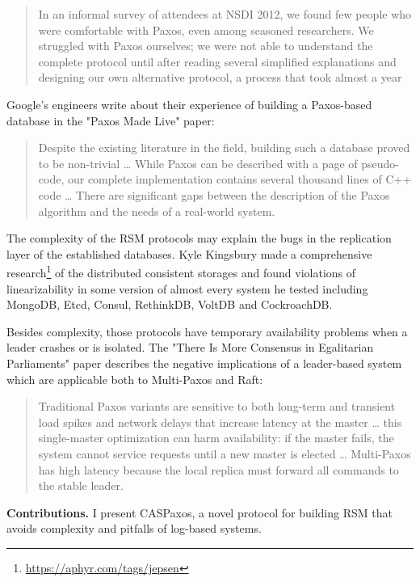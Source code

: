 \documentclass[12pt]{article}
\theoremstyle{definition}
\begin{document}
\begin{quote}
In an informal survey of attendees at NSDI 2012, we found few people who were comfortable with Paxos, even among seasoned researchers. We struggled with Paxos ourselves; we were not able to understand the complete protocol until after reading several simplified explanations and designing our own alternative protocol, a process that took almost a year
\end{quote}

Google's engineers write about their experience of building a Paxos-based database in the "Paxos Made Live"\cite{chubby} paper:

\begin{quote}
Despite the existing literature in the field, building such a database proved to be non-trivial \ldots{} While Paxos can be described with a page of pseudo-code, our complete implementation contains several thousand lines of C++ code \ldots{} There are significant gaps between the description of the Paxos algorithm and the needs of a real-world system.
\end{quote}

The complexity of the RSM protocols may explain the bugs in the replication layer of the established databases. Kyle Kingsbury made a comprehensive research\footnote{\href{https://aphyr.com/tags/jepsen}{https://aphyr.com/tags/jepsen}} of the distributed consistent storages and found violations of linearizability in some version of almost every system he tested including MongoDB, Etcd, Consul, RethinkDB, VoltDB and CockroachDB.

Besides complexity, those protocols have temporary availability problems when a leader crashes or is isolated. The "There Is More Consensus in Egalitarian Parliaments" paper\cite{epaxos} describes the negative implications of a leader-based system which are applicable both to Multi-Paxos and Raft:

\begin{quote}
Traditional Paxos variants are sensitive to both long-term and transient load spikes and network delays that increase latency at the master \ldots{} this single-master optimization can harm availability: if the master fails, the system cannot service requests until a new master is elected \ldots{} Multi-Paxos has high latency because the local replica must forward all commands to the stable leader.
\end{quote}

{\bf Contributions.} I present CASPaxos, a novel protocol for building RSM that avoids complexity and pitfalls of log-based systems.
\end{document}
